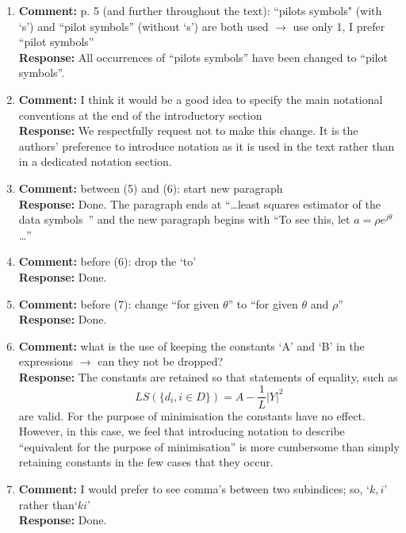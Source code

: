 \documentclass{article}
\newcommand{\abs}[1]{{\left\vert #1 \right\vert}}
\begin{document}
\begin{enumerate}
\item \textbf{Comment:} p. 5 (and further throughout the text): ``pilots symbols" (with `s') and ``pilot symbols'' (without `s') are both used $\to$ use only 1, I prefer ``pilot symbols'' \\
\textbf{Response:} All occurrences of ``pilots symbols'' have been changed to ``pilot symbols''. 

\item \label{rev2:commentnotationsection} \textbf{Comment:} I think it would be a good idea to specify the main notational conventions at the end of the introductory section \\
\textbf{Response:} We respectfully request not to make this change.  It is the authors' preference to introduce notation as it is used in the text rather than in a dedicated notation section. %

\item \textbf{Comment:} between (5) and (6): start new paragraph \\
\textbf{Response:} Done.  The paragraph ends at ``\dots least squares estimator of the data symbols~\cite{Sweldens2001,Mackenthun1994}'' and the new paragraph begins with ``To see this, let $a = \rho e^{j\theta}$ \dots''

\item \textbf{Comment:} before (6): drop the `to' \\
\textbf{Response:} Done.

\item \textbf{Comment:} before (7): change ``for given $\theta$'' to ``for given $\theta$ and $\rho$'' \\
\textbf{Response:} Done.

\item \textbf{Comment:} what is the use of keeping the constants `A' and `B' in the expressions $\to$ can they not be dropped? \\
\textbf{Response:} The constants are retained so that statements of equality, such as
\[
LS(\{d_i, i \in D\}) = A - \frac{1}{L}\abs{Y}^2
\]
are valid. For the purpose of minimisation the constants have no effect.  However, in this case, we feel that introducing notation to describe ``equivalent for the purpose of minimisation'' is more cumbersome than simply retaining constants in the few cases that they occur.

\item \textbf{Comment:} I would prefer to see comma's between two subindices; so, `$k,i$' rather than`$ki$' \\
\textbf{Response:} Done.


\end{enumerate}
\end{document}
